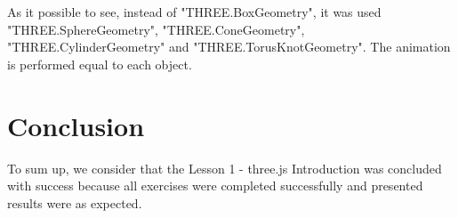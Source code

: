 \documentclass[12pt]{article}
\begin{document}
\noindent
As it possible to see, instead of "THREE.BoxGeometry", it was used "THREE.SphereGeometry", "THREE.ConeGeometry",  "THREE.CylinderGeometry" and "THREE.TorusKnotGeometry". The animation is performed equal to each object.

\section*{Conclusion}
\label{Concl}

To sum up, we consider that the Lesson 1 -  three.js Introduction was concluded with success because all exercises were completed successfully and presented results were as expected.

\end{document}
